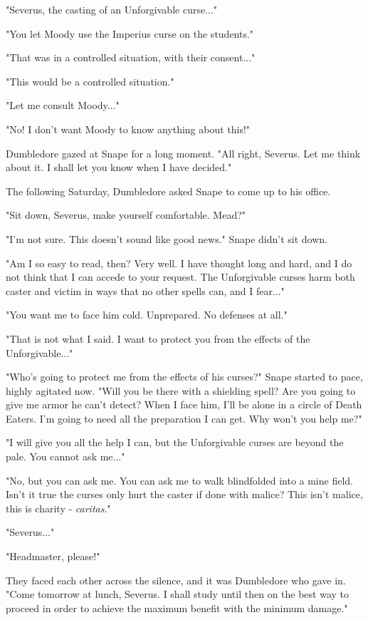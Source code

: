 "Severus, the casting of an Unforgivable curse..."

"You let Moody use the Imperius curse on the students."

"That was in a controlled situation, with their consent..."

"This would be a controlled situation."

"Let me consult Moody..."

"No! I don't want Moody to know anything about this!"

Dumbledore gazed at Snape for a long moment. "All right, Severus. Let me think about it. I shall let you know when I have decided."

The following Saturday, Dumbledore asked Snape to come up to his office.

"Sit down, Severus, make yourself comfortable. Mead?"

"I'm not sure. This doesn't sound like good news." Snape didn't sit down.

"Am I so easy to read, then? Very well. I have thought long and hard, and I do not think that I can accede to your request. The Unforgivable curses harm both caster and victim in ways that no other spells can, and I fear..."

"You want me to face him cold. Unprepared. No defenses at all."

"That is not what I said. I want to protect you from the effects of the Unforgivable..."

"Who's going to protect me from the effects of his curses?" Snape started to pace, highly agitated now. "Will you be there with a shielding spell? Are you going to give me armor he can't detect? When I face him, I'll be alone in a circle of Death Eaters. I'm going to need all the preparation I can get. Why won't you help me?"

"I will give you all the help I can, but the Unforgivable curses are beyond the pale. You cannot ask me..."

"No, but you can ask me. You can ask me to walk blindfolded into a mine field. Isn't it true the curses only hurt the caster if done with malice? This isn't malice, this is charity - \emph{caritas}."

"Severus..."

"Headmaster, please!"

They faced each other across the silence, and it was Dumbledore who gave in. "Come tomorrow at lunch, Severus. I shall study until then on the best way to proceed in order to achieve the maximum benefit with the minimum damage."

